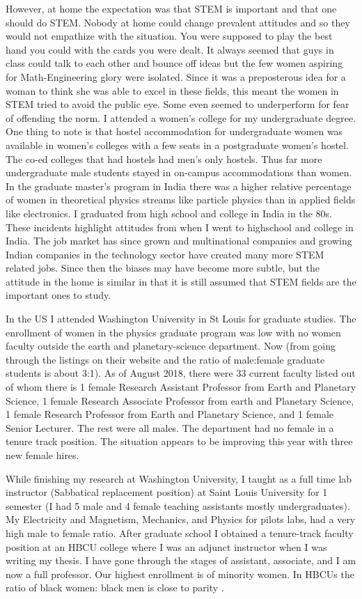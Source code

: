 \documentclass[utf8]{frontiersSCNS} %
\begin{document}
However, at home the expectation was that STEM is important and that one should do STEM. Nobody at home could change prevalent attitudes and so they would not empathize with the situation. You were supposed to play the best hand you could with the cards you were dealt. It always seemed that guys in class could talk to each other and bounce off ideas but the few women aspiring for Math-Engineering glory were isolated.  Since it was a preposterous idea for a woman to think she was able to excel in these fields, this meant the women in STEM tried to avoid the public eye. Some even seemed to underperform for fear of offending the norm. I attended a women's college for my undergraduate degree. One thing to note is that hostel accommodation for undergraduate women was available in women's colleges with a few seats in a postgraduate women's hostel. The co-ed colleges that had hostels had men's only hostels. Thus far more undergraduate male students stayed in on-campus accommodations than women. In the graduate master's program in India there was a higher relative percentage of women in theoretical physics streams like particle physics than in applied fields like electronics. I graduated from high school and college in India in the 80s. These incidents highlight attitudes from when I went to highschool and college in India. The job market has since grown and multinational companies and growing Indian companies in the technology sector have created many more STEM related jobs. Since then the biases may have become more subtle, but the attitude in the home is similar in that it is still assumed that STEM fields are the important ones to study. 

In the US I attended Washington University in St Louis for graduate studies. The enrollment of women in the physics graduate program was low with no women faculty outside the earth and planetary-science department. Now (from going through the listings on their website and the ratio of male:female graduate students is about 3:1). As of August 2018, there were 33 current faculty listed out of whom there is 1 female Research Assistant Professor from Earth and Planetary Science, 1 female Research Associate Professor from earth and Planetary Science, 1 female Research Professor from Earth and Planetary Science, and 1 female Senior Lecturer. The rest were all males. The department had no female in a tenure track position. The situation appears to be improving this year with three new female hires.

While finishing my research at Washington University, I taught as a full time lab instructor (Sabbatical replacement position) at Saint Louis University for 1 semester (I had 5 male and 4 female teaching assistants mostly undergraduates). My Electricity and Magnetism, Mechanics, and Physics for pilots labs, had a very high male to female ratio. After graduate school I obtained a tenure-track faculty position at an HBCU college where I was an adjunct instructor when I was writing my thesis. I have gone through the stages of assistant, associate, and I am now a full professor. Our highest enrollment is of minority women.  In HBCUs the ratio of black women: black men is close to parity \citep{simms2014educational}.  
\end{document}
